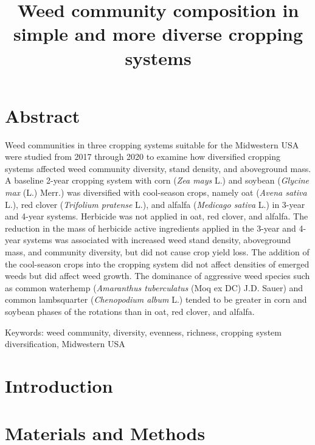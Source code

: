 \documentclass[
]{article}
\title{Weed community composition in simple and more diverse cropping systems}
\author{}
\date{\vspace{-2.5em}}
\begin{document}
\maketitle

\hypertarget{abstract}{%
\section*{Abstract}\label{abstract}}

Weed communities in three cropping systems suitable for the Midwestern USA were studied from 2017 through 2020 to examine how diversified cropping systems affected weed community diversity, stand density, and aboveground mass. A baseline 2-year cropping system with corn (\emph{Zea mays} L.) and soybean (\emph{Glycine max} (L.) Merr.) was diversified with cool-season crops, namely oat (\emph{Avena sativa} L.), red clover (\emph{Trifolium pratense} L.), and alfalfa (\emph{Medicago sativa} L.) in 3-year and 4-year systems. Herbicide was not applied in oat, red clover, and alfalfa. The reduction in the mass of herbicide active ingredients applied in the 3-year and 4-year systems was associated with increased weed stand density, aboveground mass, and community diversity, but did not cause crop yield loss. The addition of the cool-season crops into the cropping system did not affect densities of emerged weeds but did affect weed growth. The dominance of aggressive weed species such as common waterhemp (\emph{Amaranthus tuberculatus} (Moq ex DC) J.D. Sauer) and common lambsquarter (\emph{Chenopodium album} L.) tended to be greater in corn and soybean phases of the rotations than in oat, red clover, and alfalfa.

Keywords: weed community, diversity, evenness, richness, cropping system diversification, Midwestern USA

\hypertarget{introduction}{%
\section*{Introduction}\label{introduction}}

\hypertarget{materials-and-methods}{%
\section*{Materials and Methods}\label{materials-and-methods}}
\end{document}
